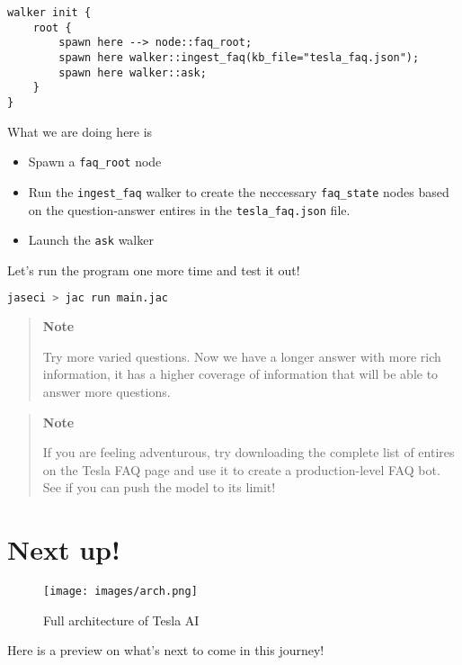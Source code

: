 \begin{lstlisting}
walker init {
    root {
        spawn here --> node::faq_root;
        spawn here walker::ingest_faq(kb_file="tesla_faq.json");
        spawn here walker::ask;
    }
}
\end{lstlisting}

What we are doing here is

\begin{itemize}
    \tightlist
    \item
          Spawn a \lstinline!faq_root! node
    \item
          Run the \lstinline!ingest_faq! walker to create the neccessary
          \lstinline!faq_state! nodes based on the question-answer entires in
          the \lstinline!tesla_faq.json! file.
    \item
          Launch the \lstinline!ask! walker
\end{itemize}

Let's run the program one more time and test it out!

\begin{lstlisting}[language=bash]
jaseci > jac run main.jac
\end{lstlisting}

\begin{quote}
    \textbf{Note}

    Try more varied questions. Now we have a longer answer with more rich
    information, it has a higher coverage of information that will be able
    to answer more questions.
\end{quote}

\begin{quote}
    \textbf{Note}

    If you are feeling adventurous, try downloading the complete list of
    entires on the Tesla FAQ page and use it to create a production-level
    FAQ bot. See if you can push the model to its limit!
\end{quote}

\section{Next up!}\label{next-up}

\begin{figure}
    \centering
    \texttt{[image: images/arch.png]}
    \caption{Full architecture of Tesla AI}
\end{figure}

Here is a preview on what's next to come in this journey!

